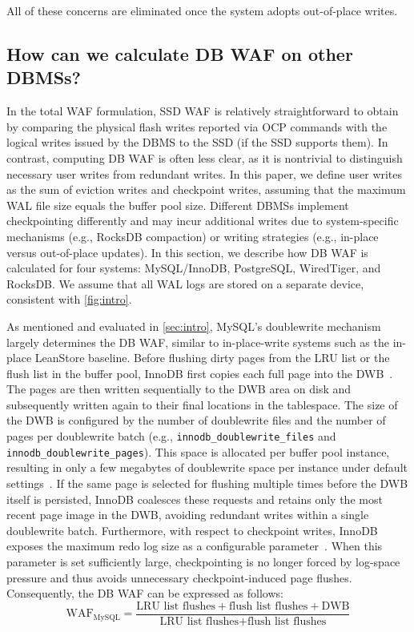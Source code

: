 All of these concerns are eliminated once the system adopts out-of-place writes.

\subsection{How can we calculate DB WAF on other DBMSs?}\label{sec:q8}
In the total WAF formulation, SSD WAF is relatively straightforward to obtain by comparing the physical flash writes reported via OCP commands with the logical writes issued by the DBMS to the SSD (if the SSD supports them).
In contrast, computing DB WAF is often less clear, as it is nontrivial to distinguish necessary user writes from redundant writes.
In this paper, we define user writes as the sum of eviction writes and checkpoint writes, assuming that the maximum WAL file size equals the buffer pool size.
Different DBMSs implement checkpointing differently and may incur additional writes due to system-specific mechanisms (e.g., RocksDB compaction) or writing strategies (e.g., in-place versus out-of-place updates).
In this section, we describe how DB WAF is calculated for four systems: MySQL/InnoDB, PostgreSQL, WiredTiger, and RocksDB.
We assume that all WAL logs are stored on a separate device, consistent with \cref{fig:intro}.

As mentioned and evaluated in \cref{sec:intro}, MySQL’s doublewrite mechanism largely determines the DB WAF, similar to in-place-write systems such as the in-place LeanStore baseline.
Before flushing dirty pages from the LRU list or the flush list in the buffer pool, InnoDB first copies each full page into the DWB~\cite{mysql-dwb}.
The pages are then written sequentially to the DWB area on disk and subsequently written again to their final locations in the tablespace.
The size of the DWB is configured by the number of doublewrite files and the number of pages per doublewrite batch (e.g., \texttt{innodb\_doublewrite\_files} and \texttt{innodb\_doublewrite\_pages}).
This space is allocated per buffer pool instance, resulting in only a few megabytes of doublewrite space per instance under default settings~\cite{mysql-sourcecode}.
If the same page is selected for flushing multiple times before the DWB itself is persisted, InnoDB coalesces these requests and retains only the most recent page image in the DWB, avoiding redundant writes within a single doublewrite batch.
Furthermore, with respect to checkpoint writes, InnoDB exposes the maximum redo log size as a configurable parameter~\cite{mysql-checkpoint}.
When this parameter is set sufficiently large, checkpointing is no longer forced by log-space pressure and thus avoids unnecessary checkpoint-induced page flushes.
Consequently, the DB WAF can be expressed as follows:
\[
\text{WAF}_{\text{MySQL}} =
\frac{\text{LRU list flushes} + \text{flush list flushes} + \text{DWB}}
     {\text{LRU list flushes} + \text{flush list flushes}}
\]

